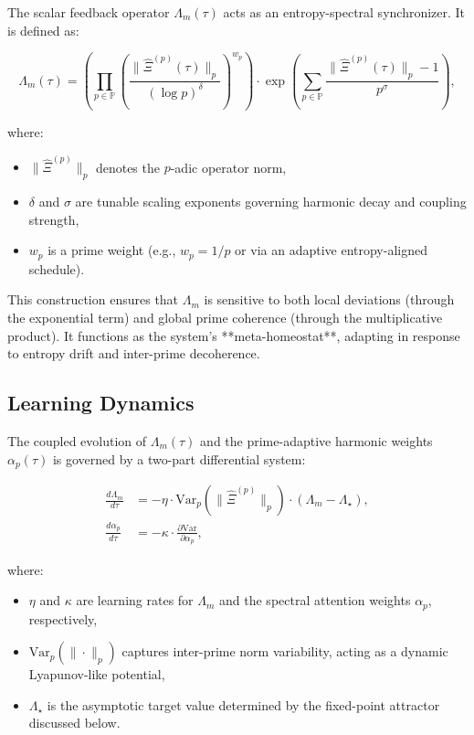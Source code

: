 \documentclass[12pt]{article}
\theoremstyle{plain}
\begin{document}
The scalar feedback operator $\Lambda_m(\tau)$ acts as an entropy-spectral synchronizer. It is defined as:

\begin{equation}
\Lambda_m(\tau) = \left( \prod_{p \in \mathbb{P}} \left( \frac{\|\hat{\Xi}^{(p)}(\tau)\|_p}{(\log p)^\delta} \right)^{w_p} \right) \cdot \exp \left( \sum_{p \in \mathbb{P}} \frac{\|\hat{\Xi}^{(p)}(\tau)\|_p - 1}{p^\sigma} \right),
\end{equation}

where:
\begin{itemize}
    \item $\|\hat{\Xi}^{(p)}\|_p$ denotes the $p$-adic operator norm,
    \item $\delta$ and $\sigma$ are tunable scaling exponents governing harmonic decay and coupling strength,
    \item $w_p$ is a prime weight (e.g., $w_p = 1/p$ or via an adaptive entropy-aligned schedule).
\end{itemize}

This construction ensures that $\Lambda_m$ is sensitive to both local deviations (through the exponential term) and global prime coherence (through the multiplicative product). It functions as the system’s **meta-homeostat**, adapting in response to entropy drift and inter-prime decoherence.

\subsection{Learning Dynamics}

The coupled evolution of $\Lambda_m(\tau)$ and the prime-adaptive harmonic weights $\alpha_p(\tau)$ is governed by a two-part differential system:

\begin{align}
\frac{d\Lambda_m}{d\tau} &= -\eta \cdot \text{Var}_p(\|\hat{\Xi}^{(p)}\|_p) \cdot (\Lambda_m - \Lambda_\star), \\
\frac{d\alpha_p}{d\tau} &= -\kappa \cdot \frac{\partial \text{Var}}{\partial \alpha_p},
\end{align}

where:
\begin{itemize}
    \item $\eta$ and $\kappa$ are learning rates for $\Lambda_m$ and the spectral attention weights $\alpha_p$, respectively,
    \item $\text{Var}_p(\|\cdot\|_p)$ captures inter-prime norm variability, acting as a dynamic Lyapunov-like potential,
    \item $\Lambda_\star$ is the asymptotic target value determined by the fixed-point attractor discussed below.
\end{itemize}
\end{document}
